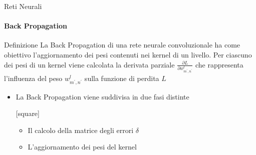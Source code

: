 \documentclass[
 ]{beamer}
\begin{document}

\begin{frame}{Reti Neurali}
    \framesubtitle{Back Propagation}
    
    \begin{block}{Definizione}
    La Back Propagation di una rete neurale convoluzionale ha come obiettivo l'aggiornamento dei pesi contenuti nei kernel di un livello. Per ciascuno dei pesi di un kernel viene calcolata la derivata parziale $\frac{\partial L}{\partial w_{m^{\prime}, n^{\prime}}^l}$ che rappresenta l'influenza del peso $w_{m^{\prime}, n^{\prime}}^l$ sulla funzione di perdita $L$
    \end{block}\pause
    
    \bigskip
    
     \begin{itemize} [<+->]
        \setlength\itemsep{2em}
        \item \large La Back Propagation viene suddivisa in due fasi distinte
        
        \bigskip
        
        [square] 
        \begin{itemize} [<+->] 
        \setlength\itemsep{1.5em}
            \item \large Il calcolo della matrice degli errori $\delta$
            \item \large L'aggiornamento dei pesi del kernel                     
        \end{itemize}
    \end{itemize}     
\end{frame}
\end{document}
